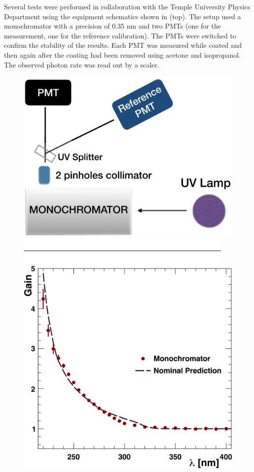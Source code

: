 Several tests were performed in collaboration with the Temple University Physics Department using the equipment schematics
shown in  (top). The setup used a monochromator with a precision of 0.35 nm and two PMTs
(one for the measurement, one for the   reference calibration). The PMTs were switched to confirm the stability of the results.
Each PMT was measured while coated and then again after the coating had been removed using acetone and isopropanol.
The observed photon rate was read out by a scaler.

\begin{figure}
	\centering
	\includegraphics[width=0.99\columnwidth, height=0.65\columnwidth]{img/pmtTestingSetup.png}
	\includegraphics[width=0.99\columnwidth, keepaspectratio]{img/blank.png}
	\includegraphics[width=0.99\columnwidth, keepaspectratio]{img/ptQEResults.png}

\end{figure}
